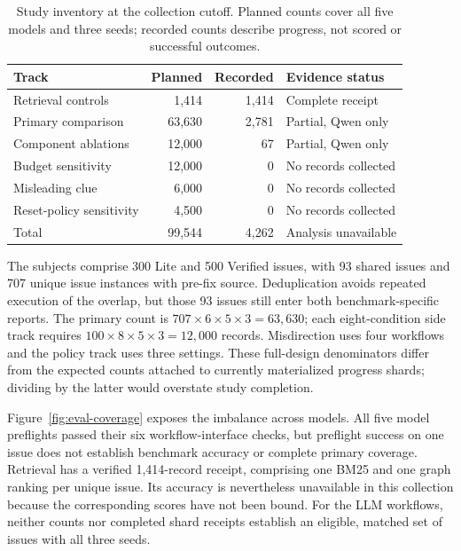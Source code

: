\documentclass[letterpaper,journal]{IEEEtran}
\begin{document}
\begin{table}[t]
\caption{Study inventory at the collection cutoff. Planned counts cover all five models and three seeds; recorded counts describe progress, not scored or successful outcomes.}\label{tab:eval-coverage}
\centering\scriptsize
\begin{tabular}{@{}lrrl@{}}\toprule
Track & Planned & Recorded & Evidence status\\\midrule
Retrieval controls & 1,414 & 1,414 & Complete receipt\\
Primary comparison & 63,630 & 2,781 & Partial, Qwen only\\
Component ablations & 12,000 & 67 & Partial, Qwen only\\
Budget sensitivity & 12,000 & 0 & No records collected\\
Misleading clue & 6,000 & 0 & No records collected\\
Reset-policy sensitivity & 4,500 & 0 & No records collected\\\midrule
Total & 99,544 & 4,262 & Analysis unavailable\\\bottomrule
\end{tabular}
\end{table}

The subjects comprise 300 Lite and 500 Verified issues, with 93 shared issues and 707 unique issue instances with pre-fix source. Deduplication avoids repeated execution of the overlap, but those 93 issues still enter both benchmark-specific reports. The primary count is $707\times6\times5\times3=63{,}630$; each eight-condition side track requires $100\times8\times5\times3=12{,}000$ records. Misdirection uses four workflows and the policy track uses three settings. These full-design denominators differ from the expected counts attached to currently materialized progress shards; dividing by the latter would overstate study completion.

Figure~\ref{fig:eval-coverage} exposes the imbalance across models. All five model preflights passed their six workflow-interface checks, but preflight success on one issue does not establish benchmark accuracy or complete primary coverage. Retrieval has a verified 1,414-record receipt, comprising one BM25 and one graph ranking per unique issue. Its accuracy is nevertheless unavailable in this collection because the corresponding scores have not been bound. For the LLM workflows, neither counts nor completed shard receipts establish an eligible, matched set of issues with all three seeds.
\end{document}
